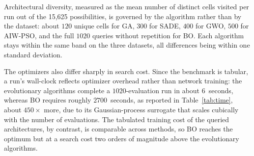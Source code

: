 \documentclass[runningheads]{llncs}
\begin{document}
Architectural diversity, measured as the mean number of distinct cells visited per run out of the 15{,}625 possibilities, is governed by the algorithm rather than by the dataset: about $120$ unique cells for GA, $300$ for SADE, $400$ for GWO, $500$ for AIW-PSO, and the full $1020$ queries without repetition for BO. Each algorithm stays within the same band on the three datasets, all differences being within one standard deviation.

The optimizers also differ sharply in search cost. Since the benchmark is tabular, a run's wall-clock reflects optimizer overhead rather than network training: the evolutionary algorithms complete a $1020$-evaluation run in about $6$~seconds, whereas BO requires roughly $2700$~seconds, as reported in Table~\ref{tab:time}, about $450\times$ more, due to its Gaussian-process surrogate that scales cubically with the number of evaluations. The tabulated training cost of the queried architectures, by contrast, is comparable across methods, so BO reaches the optimum but at a search cost two orders of magnitude above the evolutionary algorithms.
\end{document}
